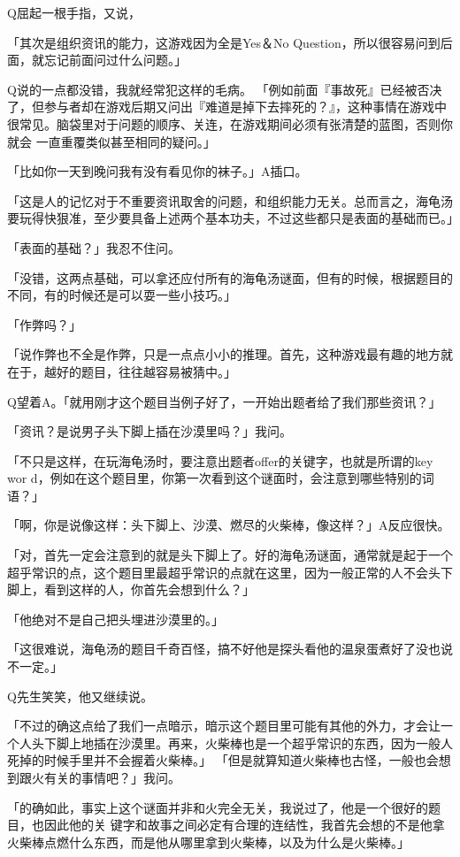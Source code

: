 \documentclass{article}
\begin{document}
Q屈起一根手指，又说， 

「其次是组织资讯的能力，这游戏因为全是Yes＆No Question，所以很容易问到后面，就忘记前面问过什么问题。」 

Q说的一点都没错，我就经常犯这样的毛病。
「例如前面『事故死』已经被否决了，但参与者却在游戏后期又问出『难道是掉下去摔死的？』，这种事情在游戏中很常见。脑袋里对于问题的顺序、关连，在游戏期间必须有张清楚的蓝图，否则你就会
\newpage
一直重覆类似甚至相同的疑问。」 

「比如你一天到晚问我有没有看见你的袜子。」A插口。 

「这是人的记忆对于不重要资讯取舍的问题，和组织能力无关。总而言之，海龟汤要玩得快狠准，至少要具备上述两个基本功夫，不过这些都只是表面的基础而已。」 

「表面的基础？」我忍不住问。 

「没错，这两点基础，可以拿还应付所有的海龟汤谜面，但有的时候，根据题目的不同，有的时候还是可以耍一些小技巧。」 

「作弊吗？」 

「说作弊也不全是作弊，只是一点点小小的推理。首先，这种游戏最有趣的地方就在于，越好的题目，往往越容易被猜中。」 

Q望着A。「就用刚才这个题目当例子好了，一开始出题者给了我们那些资讯？」 

「资讯？是说男子头下脚上插在沙漠里吗？」我问。 

「不只是这样，在玩海龟汤时，要注意出题者offer的关键字，也就是所谓的key wor
\newpage
d，例如在这个题目里，你第一次看到这个谜面时，会注意到哪些特别的词语？」 

「啊，你是说像这样：头下脚上、沙漠、燃尽的火柴棒，像这样？」A反应很快。 

「对，首先一定会注意到的就是头下脚上了。好的海龟汤谜面，通常就是起于一个超乎常识的点，这个题目里最超乎常识的点就在这里，因为一般正常的人不会头下脚上，看到这样的人，你首先会想到什么？」 

「他绝对不是自己把头埋进沙漠里的。」 

「这很难说，海龟汤的题目千奇百怪，搞不好他是探头看他的温泉蛋煮好了没也说不一定。」 

Q先生笑笑，他又继续说。 

「不过的确这点给了我们一点暗示，暗示这个题目里可能有其他的外力，才会让一个人头下脚上地插在沙漠里。再来，火柴棒也是一个超乎常识的东西，因为一般人死掉的时候手里并不会握着火柴棒。」
「但是就算知道火柴棒也古怪，一般也会想到跟火有关的事情吧？」我问。 

「的确如此，事实上这个谜面并非和火完全无关，我说过了，他是一个很好的题目，也因此他的关
\newpage
键字和故事之间必定有合理的连结性，我首先会想的不是他拿火柴棒点燃什么东西，而是他从哪里拿到火柴棒，以及为什么是火柴棒。」 
\end{document}
